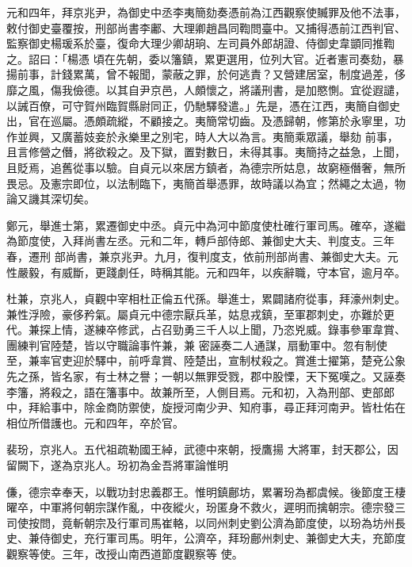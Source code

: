 \begin{pinyinscope}
 元和四年，拜京兆尹，為御史中丞李夷簡劾奏憑前為江西觀察使贓罪及他不法事，敕付御史臺覆按，刑部尚書李鄘、大理卿趙昌同鞫問臺中。又捕得憑前江西判官、監察御史楊瑗系於臺，復命大理少卿胡珦、左司員外郎胡證、侍御史韋顗同推鞫之。詔曰：「楊憑
 頃在先朝，委以籓鎮，累更選用，位列大官。近者憲司奏劾，暴揚前事，計錢累萬，曾不報聞，蒙蔽之罪，於何逃責？又營建居室，制度過差，侈靡之風，傷我儉德。以其自尹京邑，人頗懷之，將議刑書，是加愍惻。宜從遐譴，以誡百僚，可守賀州臨賀縣尉同正，仍馳驛發遣。」先是，憑在江西，夷簡自御史出，官在巡屬。憑頗疏縱，不顧接之。夷簡常切齒。及憑歸朝，修第於永寧里，功作並興，又廣蓄妓妾於永樂里之別宅，時人大以為言。夷簡乘眾議，舉劾
 前事，且言修營之僭，將欲殺之。及下獄，置對數日，未得其事。夷簡持之益急，上聞，且貶焉，追舊從事以驗。自貞元以來居方鎮者，為德宗所姑息，故窮極僭奢，無所畏忌。及憲宗即位，以法制臨下，夷簡首舉憑罪，故時議以為宜；然繩之太過，物論又譏其深切矣。



 鄭元，舉進士第，累遷御史中丞。貞元中為河中節度使杜確行軍司馬。確卒，遂繼為節度使，入拜尚書左丞。元和二年，轉戶部侍郎、兼御史大夫、判度支。三年春，遷刑
 部尚書，兼京兆尹。九月，復判度支，依前刑部尚書、兼御史大夫。元性嚴毅，有威斷，更踐劇任，時稱其能。元和四年，以疾辭職，守本官，逾月卒。



 杜兼，京兆人，貞觀中宰相杜正倫五代孫。舉進士，累闢諸府從事，拜濠州刺史。兼性浮險，豪侈矜氣。屬貞元中德宗厭兵革，姑息戎鎮，至軍郡刺史，亦難於更代。兼探上情，遂練卒修武，占召勁勇三千人以上聞，乃恣兇威。錄事參軍韋賞、團練判官陸楚，皆以守職論事忤兼，兼
 密誣奏二人通謀，扇動軍中。忽有制使至，兼率官吏迎於驛中，前呼韋賞、陸楚出，宣制杖殺之。賞進士擢第，楚兗公象先之孫，皆名家，有士林之譽；一朝以無罪受戮，郡中股慄，天下冤嘆之。又誣奏李籓，將殺之，語在籓事中。故兼所至，人側目焉。元和初，入為刑部、吏部郎中，拜給事中，除金商防禦使，旋授河南少尹、知府事，尋正拜河南尹。皆杜佑在相位所借護也。元和四年，卒於官。



 裴玢，京兆人。五代祖疏勒國王綽，武德中來朝，授鷹揚
 大將軍，封天郡公，因留闕下，遂為京兆人。玢初為金吾將軍論惟明



 傔，德宗幸奉天，以戰功封忠義郡王。惟明鎮鄜坊，累署玢為都虞候。後節度王棲曜卒，中軍將何朝宗謀作亂，中夜縱火，玢匿身不救火，遲明而擒朝宗。德宗發三司使按問，竟斬朝宗及行軍司馬崔輅，以同州刺史劉公濟為節度使，以玢為坊州長史、兼侍御史，充行軍司馬。明年，公濟卒，拜玢鄜州刺史、兼御史大夫，充節度觀察等使。三年，改授山南西道節度觀察等
 使。




\end{pinyinscope}
